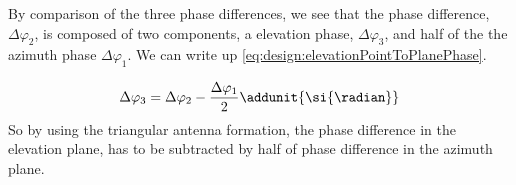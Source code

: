 By comparison of the three phase differences, we see that the phase difference, $\Delta\varphi_2$, is composed of two components, a elevation phase, $\Delta\varphi_3$, and half of the the azimuth phase $\Delta\varphi_1$. We can write up \autoref{eq:design:elevationPointToPlanePhase}.

\begin{equation}
\Delta\varphi_3 = \Delta\varphi_2 - \frac{\Delta\varphi_1}{2} \addunit{\si{\radian}} \label{eq:design:elevationPointToPlanePhase}
\end{equation}
So by using the triangular antenna formation, the phase difference in the elevation plane, has to be subtracted by half of phase difference in the azimuth plane.
